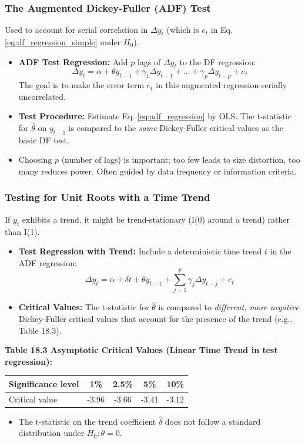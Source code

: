 \documentclass[a4paper, 10pt]{article}
\theoremstyle{definition}	%
\begin{document}
\subsubsection{The Augmented Dickey-Fuller (ADF) Test}
Used to account for serial correlation in \(\Delta y_t\) (which is \(e_t\) in Eq. \eqref{eq:df_regression_simple} under \(H_0\)).
\begin{itemize}
    \item \textbf{ADF Test Regression:} Add \(p\) lags of \(\Delta y_t\) to the DF regression:
    \begin{equation} \label{eq:adf_regression}
    \Delta y_t = \alpha + \theta y_{t-1} + \gamma_1 \Delta y_{t-1} + \dots + \gamma_p \Delta y_{t-p} + e_t
    \end{equation}
    The goal is to make the error term \(e_t\) in this augmented regression serially uncorrelated.
    \item \textbf{Test Procedure:} Estimate Eq. \eqref{eq:adf_regression} by OLS. The t-statistic for \(\hat{\theta}\) on \(y_{t-1}\) is compared to the \textit{same} Dickey-Fuller critical values as the basic DF test.
    \item Choosing \(p\) (number of lags) is important; too few leads to size distortion, too many reduces power. Often guided by data frequency or information criteria.
\end{itemize}

\subsubsection{Testing for Unit Roots with a Time Trend}
If \(y_t\) exhibits a trend, it might be trend-stationary (I(0) around a trend) rather than I(1).
\begin{itemize}
    \item \textbf{Test Regression with Trend:} Include a deterministic time trend \(t\) in the ADF regression:
    \begin{equation} \label{eq:adf_regression_trend}
    \Delta y_t = \alpha + \delta t + \theta y_{t-1} + \sum_{j=1}^p \gamma_j \Delta y_{t-j} + e_t
    \end{equation}
    \item \textbf{Critical Values:} The t-statistic for \(\hat{\theta}\) is compared to \textit{different, more negative} Dickey-Fuller critical values that account for the presence of the trend (e.g., Table 18.3).
\end{itemize}
\textbf{Table 18.3 Asymptotic Critical Values (Linear Time Trend in test regression):}
\begin{center}
\begin{tabular}{|l|c|c|c|c|}
\hline
Significance level & 1\% & 2.5\% & 5\% & 10\% \\
\hline
Critical value & -3.96 & -3.66 & -3.41 & -3.12 \\
\hline
\end{tabular}
\end{center}
\begin{itemize}
    \item The t-statistic on the trend coefficient \(\hat{\delta}\) does not follow a standard distribution under \(H_0: \theta=0\).
\end{itemize}
\end{document}
